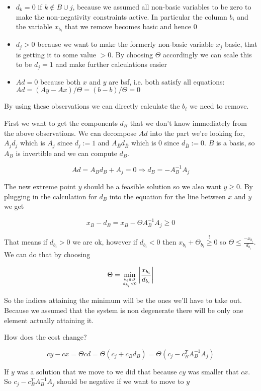 \begin{itemize}
\item $d_k=0$ if $k\not \in B \cup j$, because we assumed all non-basic variables to be zero to make the non-negativity constraints active. In particular the column $b_i$ and the variable $x_{b_i}$ that we remove becomes basic and hence 0
\item $d_j>0$ because we want to make the formerly non-basic variable $x_j$ basic, that is getting it to some value $>0$. By choosing $\Theta$ accordingly we can scale this to be $d_j=1$ and make further calculations easier
\item $Ad = 0$ because both $x$ and $y$ are bsf, i.e. both satisfy all equations: $Ad = (Ay-Ax)/\Theta = (b-b)/\Theta = 0$
\end{itemize}

By using these observations we can directly calculate the $b_i$ we need to remove.

First we want to get the components $d_B$ that we don't know immediately from the above observations. We can decompose $Ad$ into the part we're looking for, $A_j d_j$ which is $A_j$ since $d_j:=1$ and $A_{\bar B} d_{\bar B}$ which is 0 since $d_{\bar B}:=0$. $B$ is a basis, so $A_B$ is invertible and we can compute $d_B$.

\[Ad = A_B d_B+A_j = 0 \Rightarrow d_B = -A^{-1}_B A_j\]

The new extreme point $y$ should be a feasible solution so we also want $y\geq 0$. By plugging in the calculation for $d_B$ into the equation for the line between $x$ and $y$ %
we get

\[x_B - d_B = x_B - \Theta A_B^{-1} A_j \geq 0\]

That means if $d_{b_i}>0$ we are ok, however if $d_{b_i} <0$ then $x_{b_i} +\Theta_{b_i} \stackrel{!}{\geq} 0$ so $\Theta \leq \frac{-x_{b_i}}{d_{b_i}}$. We can do that by choosing

\[\Theta = \min_{{b_i\in B}\atop {d_{b_i} <0}} \left| \frac{x_{b_i}}{d_{b_i}}\right |\]

So the indices attaining the minimum will be the ones we'll have to take out. Because we assumed that the system is non degenerate there will be only one element actually attaining it. %

How does the cost change?

\[cy -cx = \Theta cd = \Theta(c_j+c_Bd_B) = \Theta(c_j - c_B^TA^{-1}_B A_j)\]

If $y$ was a solution that we move to we did that because $cy$ was smaller that $cx$. So $c_j - c_B^TA^{-1}_B A_j$ should be negative if we want to move to $y$

